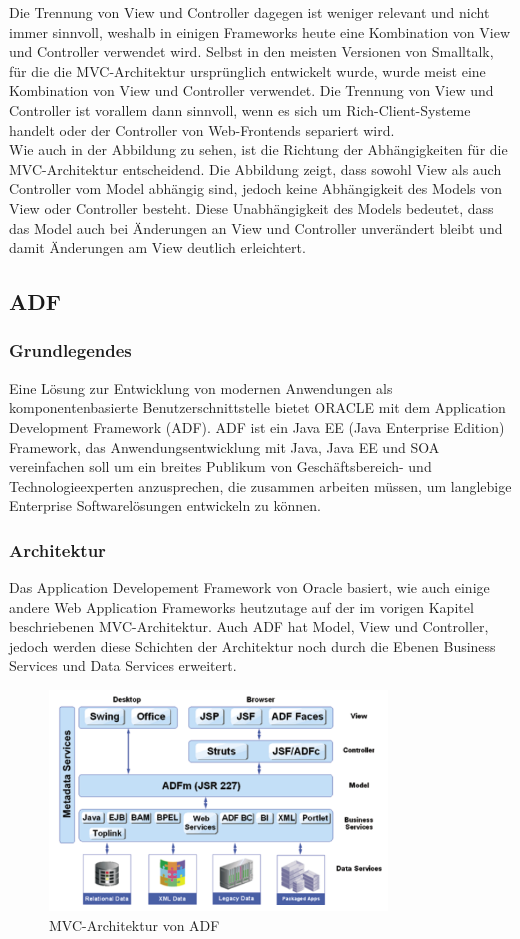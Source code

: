 Die Trennung von View und Controller dagegen ist weniger relevant und nicht immer sinnvoll, weshalb in einigen Frameworks heute eine Kombination von View und Controller verwendet wird. Selbst in den meisten Versionen von Smalltalk, für die die MVC-Architektur ursprünglich entwickelt wurde, wurde meist eine Kombination von View und Controller verwendet. Die Trennung von View und Controller ist vorallem dann sinnvoll, wenn es sich um Rich-Client-Systeme handelt oder der Controller von Web-Frontends separiert wird. \citep[S. 330-332]{PEAA2002}\\
Wie auch in der Abbildung zu sehen, ist die Richtung der Abhängigkeiten für die MVC-Architektur entscheidend. Die Abbildung zeigt, dass sowohl View als auch Controller vom Model abhängig sind, jedoch keine Abhängigkeit des Models von View oder Controller besteht. Diese Unabhängigkeit des Models bedeutet, dass das Model auch bei Änderungen an View und Controller unverändert bleibt und damit Änderungen am View deutlich erleichtert. \citep[S. 330-332]{PEAA2002}
\subsection{ADF}
\subsubsection{Grundlegendes}
Eine Lösung zur Entwicklung von modernen Anwendungen als komponentenbasierte Benutzerschnittstelle bietet ORACLE mit dem Application Development Framework (ADF). ADF ist ein Java EE (Java Enterprise Edition) Framework, das Anwendungsentwicklung mit Java, Java EE und SOA vereinfachen soll um ein breites Publikum von Geschäftsbereich- und Technologieexperten anzusprechen, die zusammen arbeiten müssen, um langlebige Enterprise Softwarelösungen entwickeln zu können\citep[S. XXIII]{OFDG2010}.
\subsubsection{Architektur}
Das Application Developement Framework von Oracle basiert, wie auch einige andere Web Application Frameworks heutzutage auf der im vorigen Kapitel beschriebenen MVC-Architektur. 
Auch ADF hat Model, View und Controller, jedoch werden diese Schichten der Architektur noch durch die Ebenen Business Services und Data Services erweitert.
\begin{figure}[H]
\centering
\includegraphics[width=0.80\textwidth]{img/MVC-ADF3.png}
\caption {MVC-Architektur von ADF}
\end{figure}

